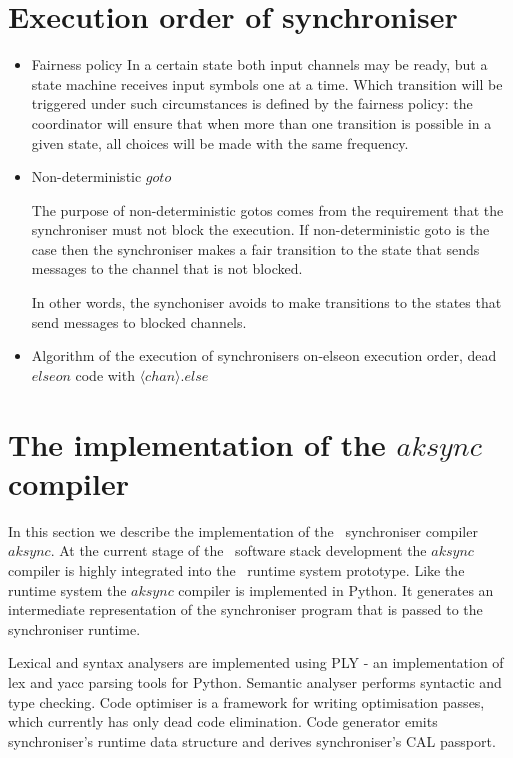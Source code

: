 \section{Execution order of synchroniser\label{execod}}
\begin{itemize}
\item Fairness policy
In a certain state both input channels may be ready, but a state machine receives input symbols one at a time. Which transition will be triggered under such circumstances is defined by the fairness policy: the coordinator will ensure that when more than one transition is possible in a given state, all choices will be made with the same frequency.

\item Non-deterministic $goto$

The purpose of non-deterministic gotos comes from the requirement that the synchroniser must not block the execution. If non-deterministic goto is the case then the synchroniser makes a fair transition to the state that sends messages to the channel that is not blocked.

In other words, the synchoniser avoids to make transitions to the states that send messages to blocked channels.


\item Algorithm of the execution of synchronisers
on-elseon execution order, dead $elseon$ code with $\langle chan \rangle .else$
\end{itemize}


\section{The implementation of the $aksync$ compiler}
In this section we describe the implementation of the \ak\ synchroniser compiler $aksync$. At the current stage of the \ak\ software stack development the $aksync$ compiler is highly integrated into the \ak\ runtime system prototype. Like the runtime system the $aksync$ compiler is implemented in Python. It generates an intermediate representation of the synchroniser program that is passed to the synchroniser runtime.

Lexical and syntax analysers are implemented using PLY \cite{ply} - an implementation of lex and yacc parsing tools for Python. Semantic analyser performs syntactic and type checking. Code optimiser is a framework for writing optimisation passes, which currently has only dead code elimination. Code generator emits synchroniser's runtime data structure and derives synchroniser's CAL passport.


